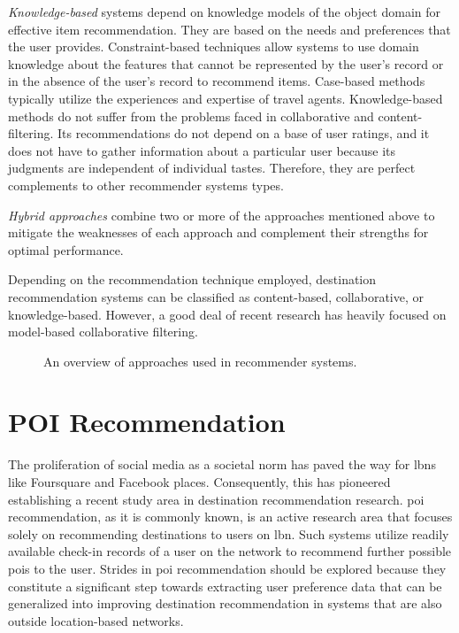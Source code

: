 \textit{Knowledge-based} systems \parencite{Burke2000Knowledge-basedSystems} depend on knowledge models of the object domain for effective item recommendation. They are based on the needs and preferences that the user provides. Constraint-based techniques \parencite{Choi2021ATourismcity} allow systems to use domain knowledge about the features that cannot be represented by the user's record or in the absence of the user's record to recommend items. Case-based methods\parencite{Montejo-Raez2011Otium:Leisure} typically utilize the experiences and expertise of travel agents. Knowledge-based methods do not suffer from the problems faced in collaborative and content-filtering. Its recommendations do not depend on a base of user ratings, and it does not have to gather information about a particular user because its
judgments are independent of individual tastes\parencite{Burke2000Knowledge-basedSystems}. Therefore, they are perfect complements to other recommender systems types. 

\textit{Hybrid approaches}\parencite{Adomavicius2005TowardExtensions,Ghazanfar2010BuildingFiltering} combine two or more of the approaches mentioned above to mitigate the weaknesses of each approach and complement their strengths for optimal performance. 

Depending on the recommendation technique employed, destination recommendation systems can be classified as content-based, collaborative, or knowledge-based. However,  a good deal of recent research has heavily focused on model-based collaborative filtering.


\begin{figure}[htpb]
  \centering
   
    \caption[Recommender Systems Approaches Overview]{An overview of approaches used in recommender systems.}\label{fig:recSystems-approaches}
\end{figure}

\section{POI Recommendation}
The proliferation of social media as a societal norm has paved the way for \Glspl{lbn} like Foursquare and Facebook places. Consequently, this has pioneered establishing a recent study area in destination recommendation research. \gls{poi} recommendation, as it is commonly known, is an active research area that focuses solely on recommending destinations to users on \gls{lbn}. Such systems utilize readily available check-in records of a user on the network to recommend further possible \glspl{poi} to the user. Strides in \gls{poi} recommendation should be explored because they constitute a significant step towards extracting user preference data that can be generalized into improving destination recommendation in systems that are also outside location-based networks.

